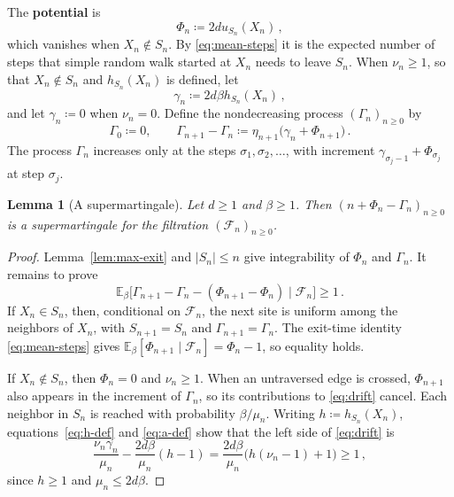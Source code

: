 \documentclass[11pt]{amsart}
\theoremstyle{plain}
\newtheorem{lemma}[theorem]{Lemma}
\theoremstyle{definition}
\newcommand{\E}{\mathbb E}
\newcommand{\defn}[1]{\textbf{#1}}
\begin{document}
	The \defn{potential} is
	\begin{equation}\label{eq:F-def}
		\Phi_n\coloneqq2du_{S_n}(X_n)\, ,
	\end{equation}
	which vanishes when $X_n\notin S_n$.  By \eqref{eq:mean-steps} it is the
	expected number of steps that simple random walk started at $X_n$ needs to
	leave $S_n$.  When $\nu_n\geq1$, so that $X_n\notin S_n$ and $h_{S_n}(X_n)$ is
	defined, let
	\begin{equation}\label{eq:a-def}
		\gamma_n\coloneqq2d\beta h_{S_n}(X_n)\, ,
	\end{equation}
	and let $\gamma_n\coloneqq0$ when $\nu_n=0$.  Define the nondecreasing process $(\Gamma_n)_{n\geq0}$ by
	\begin{equation}\label{eq:C-def}
		\Gamma_0\coloneqq0,
		\qquad
		\Gamma_{n+1}-\Gamma_n\coloneqq\eta_{n+1}\bigl(\gamma_n+\Phi_{n+1}\bigr)\, .
	\end{equation}
	The process $\Gamma_n$ increases only at the steps $\sigma_1,\sigma_2,\ldots$,
	with increment $\gamma_{\sigma_j-1}+\Phi_{\sigma_j}$ at step $\sigma_j$.

	\begin{lemma}[A supermartingale]\label{lem:martingale}
		Let $d\geq1$ and $\beta\geq1$.  Then $(n+\Phi_n-\Gamma_n)_{n\geq0}$ is a
		supermartingale for the filtration $(\mathcal F_n)_{n\geq0}$.
	\end{lemma}

	\begin{proof}
		Lemma~\ref{lem:max-exit} and $|S_n|\leq n$ give integrability of
		$\Phi_n$ and $\Gamma_n$.  It remains to prove
		\begin{equation}\label{eq:drift}
			\E_\beta\bigl[\Gamma_{n+1}-\Gamma_n-(\Phi_{n+1}-\Phi_n)\mid\mathcal F_n\bigr]
			\geq1\, .
		\end{equation}
		If $X_n\in S_n$, then, conditional on $\mathcal F_n$, the next site is
		uniform among the neighbors of $X_n$, with
		$S_{n+1}=S_n$ and $\Gamma_{n+1}=\Gamma_n$.  The exit-time identity
		\eqref{eq:mean-steps} gives
		$\E_\beta[\Phi_{n+1}\mid\mathcal F_n]=\Phi_n-1$, so equality holds.

		If $X_n\notin S_n$, then $\Phi_n=0$ and $\nu_n\geq1$.
		When an untraversed edge is crossed, $\Phi_{n+1}$ also appears in the
		increment of $\Gamma_n$, so its contributions to \eqref{eq:drift} cancel.
		Each neighbor in $S_n$ is reached with probability $\beta/\mu_n$.
		Writing $h\coloneqq h_{S_n}(X_n)$, equations~\eqref{eq:h-def} and
		\eqref{eq:a-def} show that the left side of \eqref{eq:drift} is
		\[
		\frac{\nu_n\gamma_n}{\mu_n}-\frac{2d\beta}{\mu_n}(h-1)
		=\frac{2d\beta}{\mu_n}\bigl(h(\nu_n-1)+1\bigr)\geq1\, ,
		\]
		since $h\geq1$ and $\mu_n\leq2d\beta$.
	\end{proof}
\end{document}
